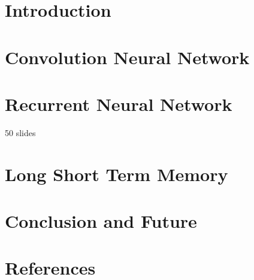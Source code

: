 \section[Intro]{Introduction}

\section[CNN]{Convolution Neural Network}

\section[RNN]{Recurrent Neural Network}
 50 slides

\section[LSTM]{Long Short Term Memory}


\section[End]{Conclusion and Future}


\section[Refs]{References}

